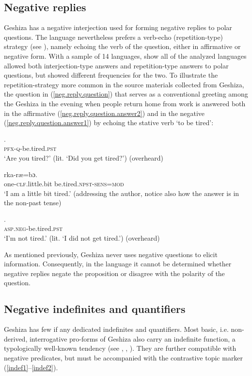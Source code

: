 \documentclass[output=paper,colorlinks,citecolor=brown]{langscibook}
\begin{document}
\subsection{Negative replies}
Geshiza has a negative interjection   used for forming negative replies to polar questions. The language nevertheless prefers a verb-echo (repetition-type) strategy (see \citealt{Holmberg2016}), namely echoing the verb of the question, either in affirmative or negative form. With a sample of 14 languages, \citet{EnfieldEtAl2019} show all of the analyzed languages allowed both interjection-type answers and repetition-type answers to polar questions, but showed different frequencies for the two. To illustrate the repetition-strategy more common in the source materials collected from Geshiza, the question in (\ref{neg.reply.question}) that serves as a conventional greeting among the Geshiza in the evening when people return home from work is answered both in the affirmative (\ref{neg.reply.question.answer2}) and in the negative (\ref{neg.reply.question.answer1}) by echoing the stative verb  `to be tired':

\ea
\label{neg.reply.question}
.\\ 
        \textsc{pfx-q}-be.tired.\textsc{pst}\\
\glt `Are you tired?' (lit. `Did you get tired?') (overheard)
\z

\ea
\label{neg.reply.question.answer2}
 {rka-ræ=bɔ.}\\ 
        one-\textsc{clf}.little.bit be.tired.\textsc{npst-sens}=\textsc{mod}\\
\glt `I am a little bit tired.' (addressing the author, notice also how the answer is in the non-past tense)
\z

\ea
\label{neg.reply.question.answer1}
.\\ 
        \textsc{asp.neg}-be.tired.\textsc{pst}\\
\glt `I'm not tired.' (lit. `I did not get tired.') (overheard)
\z

As mentioned previously, Geshiza never uses negative questions to elicit information. Consequently, in the language it cannot be determined whether negative replies negate the proposition or disagree with the polarity of the question.

\subsection{Negative indefinites and quantifiers}
\label{neg.indef}
Geshiza has few if any dedicated indefinites and quantifiers. Most basic, i.e. non-derived, interrogative pro-forms of Geshiza also carry an indefinite function, a typologically well-known tendency (see \citealt [401]{Dixon2012}, \citealt [170--179]{Haspelmath1997}, \citealt{Kahrel1996}). They are further compatible with negative predicates, but must be accompanied with the contrastive topic marker (\ref{indef1}--\ref{indef2}). 
\end{document}
